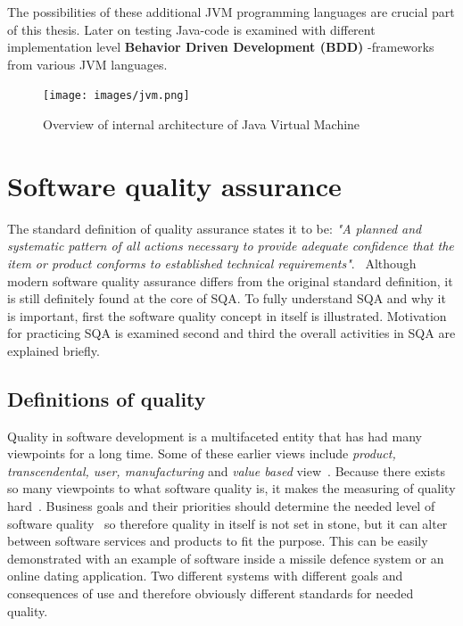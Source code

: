     The possibilities of these additional JVM programming languages are crucial part of this thesis. Later on testing Java-code is examined with
    different implementation level \textbf{Behavior Driven Development (BDD)} -frameworks from various JVM languages.

    \begin{figure}[ht]
      \begin{center}
        \texttt{[image: images/jvm.png]}
        \caption{Overview of internal architecture of Java Virtual Machine}
        \label{fig:JVM}
      \end{center}
    \end{figure}

    \clearpage

\section{Software quality assurance}
    The standard definition of quality assurance states it to be:
        \textit{"A planned and systematic pattern
        of all actions necessary to provide adequate confidence
        that the item or product conforms to established
        technical requirements"}.~\cite{buckley1978standard}
    Although modern software quality assurance differs from the original standard definition, it is still definitely found
    at the core of SQA. To fully understand SQA and why it is important, first the software quality concept in itself is illustrated.
    Motivation for practicing SQA is examined second and third the overall activities in SQA are explained briefly.
    \subsection{Definitions of quality}
    Quality in software development is a multifaceted entity that has had many viewpoints for a long time.
    Some of these earlier views include \textit{product, transcendental, user, manufacturing} and \textit{value based} view~\cite{kitchenham1996elusive}.
    Because there exists so many viewpoints to what software quality is, it makes the measuring of quality hard~\cite{kitchenham1996elusive}.
    Business goals and their priorities should determine the needed level of software quality~\cite{kitchenham1996elusive} so therefore
    quality in itself is not set in stone, but it can alter between software services and products to fit the purpose.
    This can be easily demonstrated with an example of software inside a missile defence system or an online dating application.
    Two different systems with different goals and consequences of use and therefore obviously different standards for needed quality.

